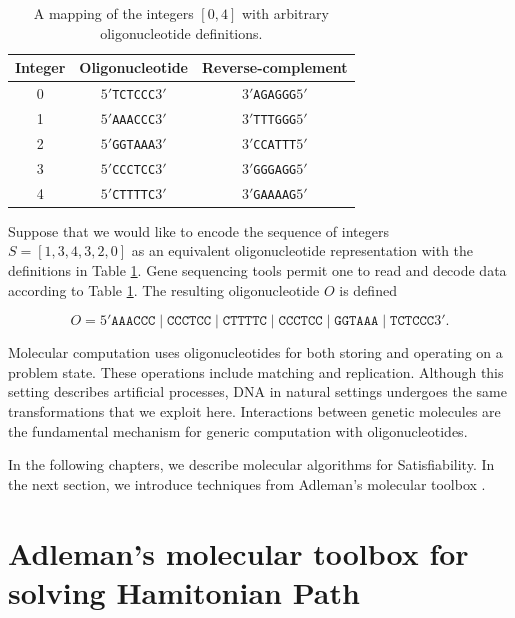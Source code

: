 \begin{table}[htdp]
\caption{A mapping of the integers $[0,4]$ with arbitrary oligonucleotide definitions.}
\begin{center}
\begin{tabular}{|c|c|c|}
\hline
 \textbf{Integer} & \textbf{Oligonucleotide} & \textbf{Reverse-complement}\\ \hline
0 & $5'$\texttt{TCTCCC}$3'$ & $3'$\texttt{AGAGGG}$5'$ \\
1 & $5'$\texttt{AAACCC}$3'$ & $3'$\texttt{TTTGGG}$5'$ \\
2 & $5'$\texttt{GGTAAA}$3'$ & $3'$\texttt{CCATTT}$5'$ \\
3 & $5'$\texttt{CCCTCC}$3'$ & $3'$\texttt{GGGAGG}$5'$ \\
4 & $5'$\texttt{CTTTTC}$3'$ & $3'$\texttt{GAAAAG}$5'$ \\ \hline
\end{tabular}
\end{center}
\label{integer2OligoTable}
\end{table}%

Suppose that we would like to encode the sequence of integers $S = [1, 3, 4, 3, 2, 0]$ as an equivalent oligonucleotide representation with the definitions in Table \ref{integer2OligoTable}.  Gene sequencing tools permit one to read and decode data according to Table \ref{integer2OligoTable}.  The resulting oligonucleotide $O$ is defined

\[
O = 5'\texttt{AAACCC}\mid \texttt{CCCTCC}\mid \texttt{CTTTTC}\mid \texttt{CCCTCC}\mid \texttt{GGTAAA}\mid \texttt{TCTCCC}3'.
\]

Molecular computation uses oligonucleotides for both storing and operating on a problem state.  These operations include matching and replication.  Although this setting describes artificial processes, DNA in natural settings undergoes the same transformations that we exploit here.  Interactions between genetic molecules are the fundamental mechanism for generic computation with oligonucleotides.
	
In the following chapters, we describe molecular algorithms for {\sc Satisfiability}.  In the next section, we introduce techniques from Adleman's molecular toolbox \cite{Adleman:1994:MCS:189441.189442}.

\section{Adleman's molecular toolbox for solving {\sc Hamitonian Path}}
	
